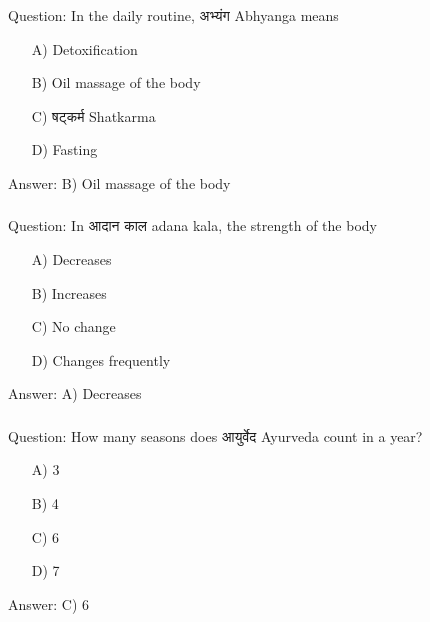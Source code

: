 %
%
%

\begin{frame}[fragile]\frametitle{}

Question: In the daily routine, अभ्यंग Abhyanga means

\begin{itemize}
\item[A)] Detoxification
\item[B)] Oil massage of the body
\item[C)] षट्कर्म Shatkarma
\item[D)] Fasting
\end{itemize}

Answer: B) Oil massage of the body
\end{frame}

\begin{frame}[fragile]\frametitle{}

Question: In आदान काल adana kala, the strength of the body

\begin{itemize}
\item[A)] Decreases
\item[B)] Increases
\item[C)] No change
\item[D)] Changes frequently
\end{itemize}

Answer: A) Decreases
\end{frame}

\begin{frame}[fragile]\frametitle{}

Question: How many seasons does आयुर्वेद Ayurveda count in a year?

\begin{itemize}
\item[A)] 3
\item[B)] 4
\item[C)] 6
\item[D)] 7
\end{itemize}

Answer: C) 6
\end{frame}

